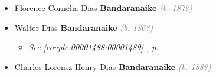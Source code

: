 \documentclass[10pt, openany]{book}
\begin{document}
\begin{itemize}
\item{Florence Cornelia Dias \textbf{Bandaranaike} \textcolor{gray}{\textit{(b. 187?)}}
   }
\item{Walter Dias \textbf{Bandaranaike} \textcolor{gray}{\textit{(b. 186?)}}
\begin{itemize}
\item{\textcolor{slteal}{\textit{See  \autoref{couple:00001488:00001489} \textit{, p. \pageref{couple:00001488:00001489} }}}}
\end{itemize}
  }
\item{Charles Lorensz Henry Dias \textbf{Bandaranaike} \textcolor{gray}{\textit{(b. 188?)}}
    }
\end{itemize}
    
\end{document}

